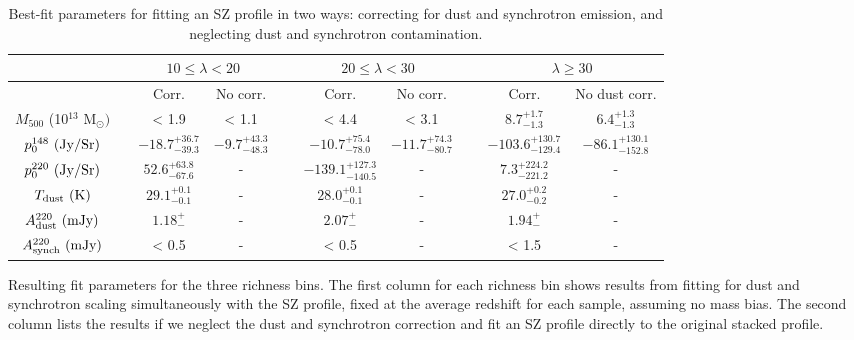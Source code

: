 \documentclass[a4paper,fleqn,usenatbib]{mnras}
\begin{document}
\begin{table}
   
  \centering
  \caption{Best-fit parameters for fitting an SZ profile in two ways: correcting for dust and synchrotron emission, and neglecting dust and synchrotron contamination.}
  \begin{threeparttable}
  \begin{tabular}{|*{10}{c|}}
    \hline
    & & \multicolumn{2}{|c}{$10 \leq \lambda < 20$} & & \multicolumn{2}{|c|}{$20 \leq \lambda < 30$} & & \multicolumn{2}{|c|}{$\lambda \geq 30$}\\ \hline
    
    & & Corr. & No corr. & \ &  Corr. & No corr. & \ &  Corr. & No dust corr. \\ \hline
    
    $M_{500}$ (10$^{13}$ M$_{\odot})$ & & < 1.9 & < 1.1 & \ & < 4.4 & < 3.1 & \ & $8.7^{+1.7}_{-1.3}$ & $6.4^{+1.3}_{-1.3}$ \\ \hline
     
    $p_0^{148} \ (\rm Jy/Sr)$ & & $-18.7^{+36.7}_{-39.3}$ & $-9.7^{+43.3}_{-48.3}$ & \ & $-10.7^{+75.4}_{-78.0}$ & $-11.7^{+74.3}_{-80.7}$ & \ & $-103.6^{+130.7}_{-129.4}$ & $-86.1^{+130.1}_{-152.8}$ \\ \hline
    
    $p_0^{220} \ (\rm Jy/Sr)$ & & $52.6^{+63.8}_{-67.6}$ & - & \ & $-139.1^{+127.3}_{-140.5}$ & - & \ & $7.3^{+224.2}_{-221.2}$ & - \\ \hline
    
    $T_{\rm dust} \ (\rm K)$ & & $29.1^{+0.1}_{-0.1}$  & - & \ & $28.0^{+0.1}_{-0.1}$ & - & \ & $27.0^{+0.2}_{-0.2}$ & - \\ \hline 

    $A^{220}_{\rm dust} \ (\rm mJy)$ & & $1.18^{+}_{-}$ & - & \ & $2.07^{+}_{-}$ & - & \ & $1.94^{+}_{-}$ & - \\ \hline
    
    $A^{220}_{\rm synch} \ (\rm mJy)$ & & < 0.5 & - & \ & < 0.5 & - & \ & < 1.5 & - \\ \hline
    
  \end{tabular}
  \begin{tablenotes}
	\item Resulting fit parameters for the three richness bins. 
	The first column for each richness bin shows results from fitting for dust and synchrotron scaling simultaneously with the SZ profile, fixed at the average redshift for each sample, assuming no mass bias. 
	The second column lists the results if we neglect the dust and synchrotron correction and fit an SZ profile directly to the original stacked profile. 
  \end{tablenotes}
  \end{threeparttable}
\label{table:mcmcfitparam}
\end{table}
\end{document}

